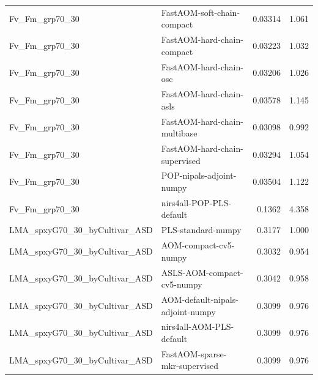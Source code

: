 \begin{landscape}
\begin{longtable}{L{8.0cm}L{9.5cm}rr}
Fv\_\allowbreak{}Fm\_\allowbreak{}grp70\_\allowbreak{}30 & FastAOM-\allowbreak{}soft-\allowbreak{}chain-\allowbreak{}compact & 0.03314 & 1.061 \\
Fv\_\allowbreak{}Fm\_\allowbreak{}grp70\_\allowbreak{}30 & FastAOM-\allowbreak{}hard-\allowbreak{}chain-\allowbreak{}compact & 0.03223 & 1.032 \\
Fv\_\allowbreak{}Fm\_\allowbreak{}grp70\_\allowbreak{}30 & FastAOM-\allowbreak{}hard-\allowbreak{}chain-\allowbreak{}osc & 0.03206 & 1.026 \\
Fv\_\allowbreak{}Fm\_\allowbreak{}grp70\_\allowbreak{}30 & FastAOM-\allowbreak{}hard-\allowbreak{}chain-\allowbreak{}asls & 0.03578 & 1.145 \\
Fv\_\allowbreak{}Fm\_\allowbreak{}grp70\_\allowbreak{}30 & FastAOM-\allowbreak{}hard-\allowbreak{}chain-\allowbreak{}multibase & 0.03098 & 0.992 \\
Fv\_\allowbreak{}Fm\_\allowbreak{}grp70\_\allowbreak{}30 & FastAOM-\allowbreak{}hard-\allowbreak{}chain-\allowbreak{}supervised & 0.03294 & 1.054 \\
Fv\_\allowbreak{}Fm\_\allowbreak{}grp70\_\allowbreak{}30 & POP-\allowbreak{}nipals-\allowbreak{}adjoint-\allowbreak{}numpy & 0.03504 & 1.122 \\
Fv\_\allowbreak{}Fm\_\allowbreak{}grp70\_\allowbreak{}30 & nirs4all-\allowbreak{}POP-\allowbreak{}PLS-\allowbreak{}default & 0.1362 & 4.358 \\
LMA\_\allowbreak{}spxyG70\_\allowbreak{}30\_\allowbreak{}byCultivar\_\allowbreak{}ASD & PLS-\allowbreak{}standard-\allowbreak{}numpy & 0.3177 & 1.000 \\
LMA\_\allowbreak{}spxyG70\_\allowbreak{}30\_\allowbreak{}byCultivar\_\allowbreak{}ASD & AOM-\allowbreak{}compact-\allowbreak{}cv5-\allowbreak{}numpy & 0.3032 & 0.954 \\
LMA\_\allowbreak{}spxyG70\_\allowbreak{}30\_\allowbreak{}byCultivar\_\allowbreak{}ASD & ASLS-\allowbreak{}AOM-\allowbreak{}compact-\allowbreak{}cv5-\allowbreak{}numpy & 0.3042 & 0.958 \\
LMA\_\allowbreak{}spxyG70\_\allowbreak{}30\_\allowbreak{}byCultivar\_\allowbreak{}ASD & AOM-\allowbreak{}default-\allowbreak{}nipals-\allowbreak{}adjoint-\allowbreak{}numpy & 0.3099 & 0.976 \\
LMA\_\allowbreak{}spxyG70\_\allowbreak{}30\_\allowbreak{}byCultivar\_\allowbreak{}ASD & nirs4all-\allowbreak{}AOM-\allowbreak{}PLS-\allowbreak{}default & 0.3099 & 0.976 \\
LMA\_\allowbreak{}spxyG70\_\allowbreak{}30\_\allowbreak{}byCultivar\_\allowbreak{}ASD & FastAOM-\allowbreak{}sparse-\allowbreak{}mkr-\allowbreak{}supervised & 0.3099 & 0.976 \\

\end{longtable}
\end{landscape}
